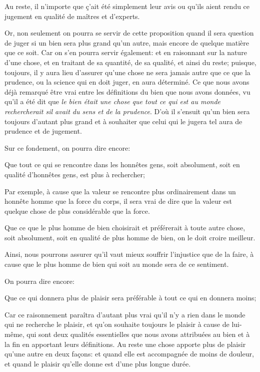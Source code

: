 Au reste, il n'importe que ç'ait été simplement leur avis ou qu'ils aient rendu ce jugement en qualité de maîtres et d'experts.

Or, non seulement on pourra se servir de cette proposition quand il sera question de juger si un bien sera plus grand qu'un autre,
mais encore de quelque matière que ce soit. Car on s'en pourra servir également: et en raisonnant sur la nature d'une chose, et en
traitant de sa quantité, de sa qualité, et ainsi du reste; puisque, toujours, il y aura lieu d’assurer qu'une chose ne sera jamais
autre que ce que la prudence, ou la science qui en doit juger, en aura déterminé. Ce que nous avons déjà remarqué être vrai entre
les définitions du bien que nous avons données, vu qu'il a été dit que \emph{le bien était une chose que tout ce qui est au monde
rechercherait sil avait du sens et de la prudence}. D'où il s'ensuit qu'un bien sera toujours d'autant plus grand et à souhaiter
que celui qui le jugera tel aura de prudence et de jugement.

\bigbreak

Sur ce fondement, on pourra dire encore:

\begin{lieu}
	Que tout ce qui se rencontre dans les honnêtes gens, soit absolument, soit en qualité d’honnêtes gens, est plus à rechercher;
\end{lieu}

Par exemple, à cause que la valeur se rencontre plus ordinairement dans un honnête homme que la force du corps, il sera vrai de
dire que la valeur est quelque chose de plus considérable que la force.

\bigbreak

\begin{lieu}
	Que ce que le plus homme de bien choisirait et préférerait à toute autre chose, soit absolument, soit en qualité de plus homme de
	bien, on le doit croire meilleur.
\end{lieu}

Ainsi, nous pourrons assurer qu'il vaut mieux souffrir l'injustice que de la faire, à cause que le plus homme de bien qui soit au monde
sera de ce sentiment.

On pourra dire encore:

\begin{lieu}
	Que ce qui donnera plus de plaisir sera préférable à tout ce qui en donnera moins;
\end{lieu}

Car ce raisonnement paraîtra d'autant plus vrai qu'il n'y a rien dans le monde qui ne recherche le plaisir, et qu'on souhaite
toujours le plaisir à cause de lui-même, qui sont deux qualités essentielles que nous avons attribuées au bien et à la fin en
apportant leurs définitions. Au reste une chose apporte plus de plaisir qu'une autre en deux façons: et quand elle est
accompagnée de moins de douleur, et quand le plaisir qu'elle donne est d'une plus longue durée.

